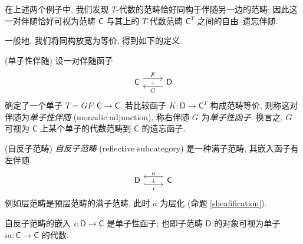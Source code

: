 在上述两个例子中, 我们发现 $T$-代数的范畴恰好同构于伴随另一边的范畴; 因此这一对伴随恰好可视为范畴 $\mathsf C$ 与其上的 $T$-代数范畴 $\mathsf C^T$ 之间的自由--遗忘伴随.

%	

一般地, 我们将同构放宽为等价, 得到如下的定义.

\begin{definition}
    {(单子性伴随)}
    设一对伴随函子
    $$
    \begin{tikzcd}[ampersand replacement=\&]
    	{\mathsf C} \& {\mathsf D}
    	\arrow[""{name=0, anchor=center, inner sep=0}, "G", shift left=2, from=1-2, to=1-1]
    	\arrow[""{name=1, anchor=center, inner sep=0}, "F", shift left=2, from=1-1, to=1-2]
    	\arrow["\dashv"{anchor=center, rotate=-90}, draw=none, from=1, to=0]
    \end{tikzcd}
    $$
    确定了一个单子 $T = GF \colon \mathsf C \to \mathsf C$.
    若比较函子 $K\colon \mathsf D\to\mathsf C^T$ 构成范畴等价, 则称这对伴随为\emph{单子性伴随} (monadic adjunction), 称右伴随 $G$ 为\emph{单子性函子}. 换言之, $G$ 可视为 $\mathsf C$ 上某个单子的代数范畴到 $\mathsf C$ 的遗忘函子.
\end{definition}

\begin{example}
	{(自反子范畴)}
	\emph{自反子范畴} (reflective subcategory) 是一种满子范畴, 其嵌入函子有左伴随.
	\[\begin{tikzcd}[ampersand replacement=\&]
		{\mathsf D} \& {\mathsf C}
		\arrow[""{name=0, anchor=center, inner sep=0}, "i"', shift right=2, hook, from=1-1, to=1-2]
		\arrow[""{name=1, anchor=center, inner sep=0}, "a"', shift right=2, from=1-2, to=1-1]
		\arrow["\dashv"{anchor=center, rotate=-90}, draw=none, from=1, to=0]
	\end{tikzcd}\]
	例如层范畴是预层范畴的满子范畴, 此时 $a$ 为层化 (命题 \ref{sheafification}).
	
	自反子范畴的嵌入 $i\colon \mathsf D\to\mathsf C$ 是单子性函子; 也即子范畴 $\mathsf D$ 的对象可视为单子 $ia\colon \mathsf C\to\mathsf C$ 的代数.
\end{example}